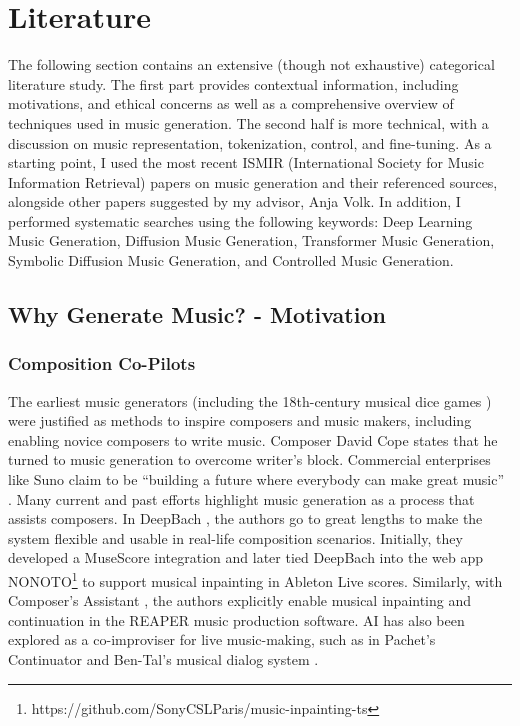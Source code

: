 

\chapter{Literature} \label{chap:data}
\pagestyle{fancy}

The following section contains an extensive (though not exhaustive) categorical literature study. The first part provides contextual information, including motivations, and ethical concerns as well as a comprehensive overview of techniques used in music generation. The second half is more technical, with a discussion on music representation, tokenization, control, and fine-tuning. 
As a starting point, I used the most recent ISMIR (International Society for Music Information Retrieval) papers on music generation and their referenced sources, alongside other papers suggested by my advisor, Anja Volk. In addition, I performed systematic searches using the following keywords: Deep Learning Music Generation, Diffusion Music Generation, Transformer Music Generation, Symbolic Diffusion Music Generation, and Controlled Music Generation.

\section{Why Generate Music? - Motivation}
\label{section:motivation}
\subsection{Composition Co-Pilots}
The earliest music generators (including the 18th-century musical dice games \cite{Nierhaus_2009}) were justified as methods to inspire composers and music makers, including enabling novice composers to write music. Composer David Cope \cite{Cope_1989} states that he turned to music generation to overcome writer’s block. Commercial enterprises like Suno claim to be “building a future where everybody can make great music” \cite{Suno_AI}. Many current and past efforts highlight music generation as a process that assists composers. In DeepBach \cite{Hadjeres_Pachet_Nielsen_2017}, the authors go to great lengths to make the system flexible and usable in real-life composition scenarios. Initially, they developed a MuseScore integration and later tied DeepBach into the web app NONOTO\footnote{https://github.com/SonyCSLParis/music-inpainting-ts} to support musical inpainting in Ableton Live scores. Similarly, with Composer’s Assistant \cite{Malandro_2023}, the authors explicitly enable musical inpainting and continuation in the REAPER music production software. AI has also been explored as a co-improviser for live music-making, such as in Pachet's Continuator \cite{Pachet_2003} and Ben-Tal's musical dialog system \cite{Kite-Powell_2023}.

